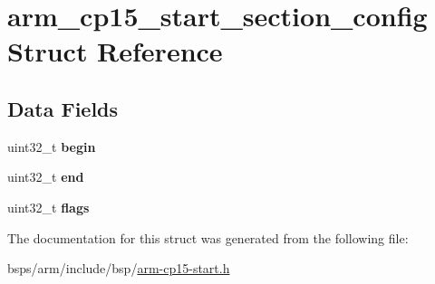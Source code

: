 \hypertarget{structarm__cp15__start__section__config}{}\section{arm\+\_\+cp15\+\_\+start\+\_\+section\+\_\+config Struct Reference}
\label{structarm__cp15__start__section__config}
\subsection*{Data Fields}
\begin{DoxyCompactItemize}
\item 
\mbox{\label{structarm__cp15__start__section__config_a0a250fa1651c5eec918b72ef217ecdf6}} 
uint32\+\_\+t {\bfseries begin}
\item 
\mbox{\label{structarm__cp15__start__section__config_a99a6cabdd91d1716c873359d68ecb34e}} 
uint32\+\_\+t {\bfseries end}
\item 
\mbox{\label{structarm__cp15__start__section__config_a9dfeb6a54eb89d2cb1dc296da631e701}} 
uint32\+\_\+t {\bfseries flags}
\end{DoxyCompactItemize}


The documentation for this struct was generated from the following file\+:\begin{DoxyCompactItemize}
\item 
bsps/arm/include/bsp/\mbox{\hyperlink{arm-cp15-start_8h}{arm-\/cp15-\/start.\+h}}\end{DoxyCompactItemize}
